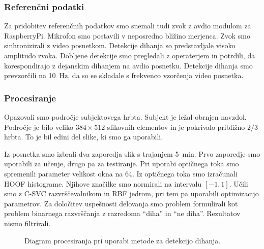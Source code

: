 \subsubsection{Referenčni podatki}
Za pridobitev referenčnih podatkov smo snemali tudi zvok z avdio modulom za RaspberryPi. Mikrofon smo postavili v neposredno bližino merjenca. Zvok smo sinhronizirali z video posnetkom. Detekcije dihanja so predstavljale visoko amplitudo zvoka. Dobljene detekcije smo pregledali z operaterjem in potrdili, da korespondirajo z dejanskim dihanjem na avdio posnetku. Detekcije dihanja smo prevzorčili na \SI{10}{Hz}, da so se skladale s frekvenco vzorčenja video posnetka.

\subsubsection{Procesiranje}\label{sec:data-preprocessing}
Opazovali smo področje subjektovega hrbta. Subjekt je ležal obrnjen navzdol. Področje je bilo veliko $384 \times 512$ slikovnih elementov in je pokrivalo približno $2/3$ hrbta. To je bil edini del slike, ki smo ga uporabili.

Iz posnetka smo izbrali dva zaporedja slik s trajanjem \SI{5}{min}. Prvo zaporedje smo uporabili za učenje, drugo pa za testiranje. Pri uporabi optičnega toka smo spremenili parameter velikost okna na $64$. Iz optičnega toka smo izračunali HOOF histograme. Njihove značilke smo normirali na intervalu $[-1,1]$. Učili smo z C-SVC razvrščevalnikom in RBF jedrom, pri tem pa uporabili optimizacijo parametrov. Za določitev uspešnosti delovanja smo problem formulirali kot problem binarnega razvrščanja z razredoma ``diha'' in ``ne diha''. Rezultatov nismo filtrirali.

\begin{figure}[htb]
	\centering
	
	\caption[]{Diagram procesiranja pri uporabi metode za detekcijo dihanja.}
	\label{fig:dihanje-postopek}
\end{figure}


